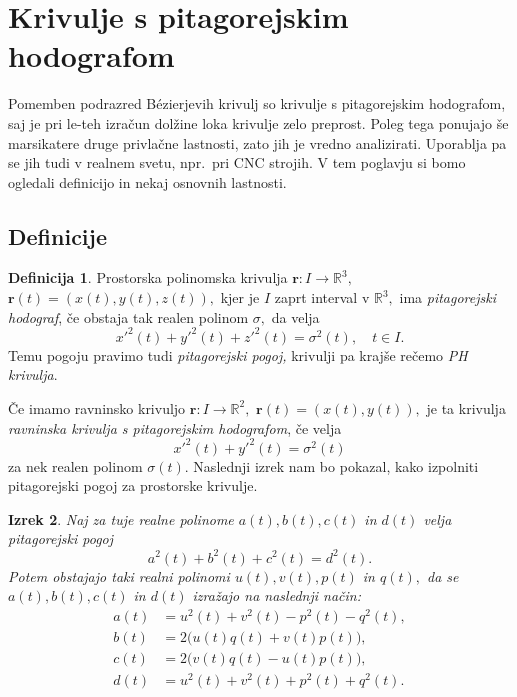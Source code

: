 \documentclass[12pt,a4paper,twoside]{article}
\theoremstyle{definition} %
\newtheorem{definicija}{Definicija}[section]
\theoremstyle{plain} %
\newtheorem{izrek}[definicija]{Izrek}
\theoremstyle{primerstyle}
\numberwithin{equation}{section}  %
\newcommand{\R}{\mathbb R}
\newcommand{\rV}{\mathbf{r}}
\begin{document}
\section{Krivulje s pitagorejskim hodografom}

Pomemben podrazred Bézierjevih krivulj so krivulje s pitagorejskim hodografom, saj je pri le-teh izračun dolžine loka krivulje zelo preprost. Poleg tega ponujajo še marsikatere druge privlačne lastnosti, zato jih je vredno analizirati. Uporablja pa se jih tudi v realnem svetu, npr.\ pri CNC strojih. V tem poglavju si bomo ogledali definicijo in nekaj osnovnih lastnosti.

\subsection{Definicije}

\begin{definicija}
	Prostorska polinomska krivulja $\rV:I \to \R^3,$ $\rV(t)=(x(t),y(t),z(t)),$ kjer je $I$ zaprt interval v $\R^3,$ ima \emph{pitagorejski hodograf}, če obstaja tak realen polinom $\sigma,$ da velja
	\begin{equation}
		\label{pitagorejski}
		x'^2(t)+y'^2(t)+z'^2(t)=\sigma^2(t),\quad t\in I.
	\end{equation}
	Temu pogoju pravimo tudi \emph{pitagorejski pogoj,} krivulji pa krajše rečemo \emph{PH krivulja}.
\end{definicija}

Če imamo ravninsko krivuljo $\rV:I \to \R^2,$ $\rV(t)=(x(t),y(t)),$ je ta krivulja \emph{ravninska krivulja s pitagorejskim hodografom}, če velja
\begin{equation}
	\label{ravninski_pitagorejski}
	x'^2(t)+y'^2(t)=\sigma^2(t)
\end{equation}
za nek realen polinom $\sigma(t).$ Naslednji izrek nam bo pokazal, kako izpolniti pitagorejski pogoj za prostorske krivulje.
\begin{izrek}
	\label{PH_pogoj_izrek}
	Naj za tuje realne polinome $a(t),b(t),c(t)$ in $d(t)$ velja pitagorejski pogoj
	\begin{equation}
		\label{pogoj_izrek4_2}
		a^2(t)+b^2(t)+c^2(t)=d^2(t).
	\end{equation}
	Potem obstajajo taki realni polinomi $u(t),v(t),p(t)$ in $q(t),$ da se $a(t),b(t),c(t)$ in $d(t)$ izražajo na naslednji način:
	\begin{align}
		a(t)&=u^2(t)+v^2(t)-p^2(t)-q^2(t), \nonumber \\
		b(t)&=2\big(u(t)q(t)+v(t)p(t)\big), \label{izrek4_3} \\
		c(t)&=2\big(v(t)q(t)-u(t)p(t)\big), \nonumber \\
		d(t)&=u^2(t)+v^2(t)+p^2(t)+q^2(t). \nonumber
	\end{align}
\end{izrek}
\end{document}
